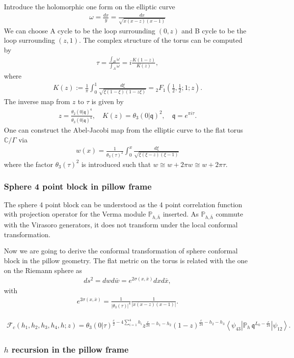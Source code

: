 \documentclass[12pt]{article}
\newcommand{\ie}{\begin{equation}\begin{aligned}}
\newcommand{\fe}{\end{aligned}\end{equation}}
\numberwithin{equation}{section}
\begin{document}
Introduce the holomorphic one form on the elliptic curve
\ie
\omega =\frac{dx}{y} = \frac{dx}{\sqrt{x(x-z)(x-1)}}
\fe
We can choose A cycle to be the loop surrounding $(0,z)$ and B cycle to be the loop surrounding $(z,1)$. The complex structure of the torus can be computed by
\ie
\tau =\frac{\int_{B}\omega}{\int_{A}\omega} =  i\frac{K(1-z)}{K(z)}, 
 \fe
where
\ie
K(z):= \frac{1}{\pi}\int_0^1\frac{d\xi}{\sqrt{\xi(1-\xi)(1-z\xi)}} ={}_2F_1\!\left(\frac12,\frac12;1;z\right).
\fe
The inverse map from $z$ to $\tau$ is given by
\ie
z=\frac{\theta_2(0|\mathfrak{q})^4}{\theta_3(0|\mathfrak{q})^4}, \quad K(z) = \theta_3(0|\mathfrak{q})^2, \quad \mathfrak{q}=e^{\pi i\tau}.
\fe
One can construct the Abel-Jacobi map from the elliptic curve to the flat torus $\mathbb{C}/\Gamma$ via
\ie
w(x)= \frac{1}{\theta_3(\tau)^2}\int_0^{x}  \frac{d\xi}{\sqrt{\xi(\xi-z)(\xi-1)}}
\fe
where the factor $\theta_3(\tau)^2$ is introduced such that $w\cong w+2\pi w\cong w+2\pi \tau$.

\subsubsection*{Sphere 4 point block in pillow frame}

The sphere 4 point block can be understood as the 4 point correlation function with projection operator for the Verma module $\mathbb{P}_{h,\bar{h}}$ inserted. As $\mathbb{P}_{h,\bar{h}}$ commute with the Virasoro generators, it does not transform under the local conformal transformation.

Now we are going to derive the conformal transformation of sphere conformal block in the pillow geometry. The flat metric on the torus is related with the one on the Riemann sphere as
\ie
ds^2 =dwd\bar{w} = e^{2\sigma(x,\bar{x})}dx d\bar{x},
\fe
with 
\ie
e^{2\sigma(x,\bar{x})}= \frac{1}{|\theta_3(\tau)|^4} \frac{1}{|x(x-z)(x-1)|}.
\fe



\ie
\mathcal F_c(h_1,h_2,h_3,h_4,h;z)
={}
\theta_3(0|\tau)^{\frac c2-4\sum_{i=1}^4 h_i}
z^{\frac c{24}-h_1-h_2}
(1-z)^{\frac c{24}-h_2-h_3}
\left\langle\psi_{43}\left|
\mathbb P_h\,\mathfrak{q}^{L_0-\frac c{24}}
\right|\psi_{12}\right\rangle.
\fe

\subsubsection*{$h$ recursion in the pillow frame}
\end{document}
